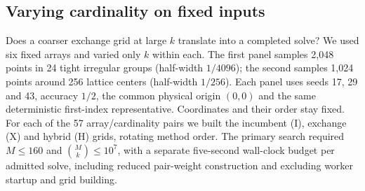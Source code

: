 \documentclass[a4paper,12pt]{article}
\numberwithin{equation}{section}
\begin{document}
\subsection{Varying cardinality on fixed inputs}\label{app:fixed-input}
Does a coarser exchange grid at large $k$ translate into a completed solve? We used six fixed
arrays and varied only $k$ within each. The first panel samples 2,048 points in 24 tight
irregular groups (half-width $1/4096$); the second samples 1,024 points around 256 lattice
centers (half-width $1/256$). Each panel uses seeds 17, 29 and 43, accuracy $1/2$, the common
physical origin $(0,0)$ and the same deterministic first-index representative. Coordinates
and their order stay fixed. For each of the 57 array/cardinality pairs we built the incumbent
(I), exchange (X) and hybrid (H) grids, rotating method order. The primary search required
$M\le160$ and $\binom Mk\le10^7$, with a separate five-second wall-clock budget per admitted
solve, including reduced pair-weight construction and excluding worker startup and grid building.
\end{document}
